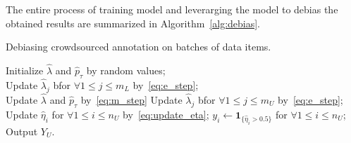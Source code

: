 The entire process of training model and leverarging the model to debias the obtained results 
are summarized in Algorithm~\ref{alg:debias}.  

\incmargin{1em}
\begin{algorithm}[!t]
       \caption{Debiasing crowdsourced annotation on batches of data items.}\label{alg:debias}
\small

       \BlankLine
       Initialize $\hat{\lambda}$ and $\hat{p}_{\tau}$ by random values; \\
       {
           Update $\hat{\lambda}_j$ bfor $\forall 1 \leq j \leq m_L$ by~\eqref{eq:e_step}; \\
           Update $\hat{\lambda}$ and $\hat{p}_{\tau}$ by~\eqref{eq:m_step}
       }
       \BlankLine
       {
       	   Update $\hat{\lambda}_j$ bfor $\forall 1 \leq j \leq m_U$ by~\eqref{eq:e_step}; \\
           Update $\hat{\eta}_i$ for $\forall 1 \leq i \leq n_U$ by~\eqref{eq:update_eta};
       }
       $y_i \leftarrow \mathbf{1}_{\{\hat{\eta}_i > 0.5\}}$ for $\forall 1 \leq i \leq n_U$; \\
       Output $Y_U$.
\end{algorithm}
\normalsize
\decmargin{1em}


